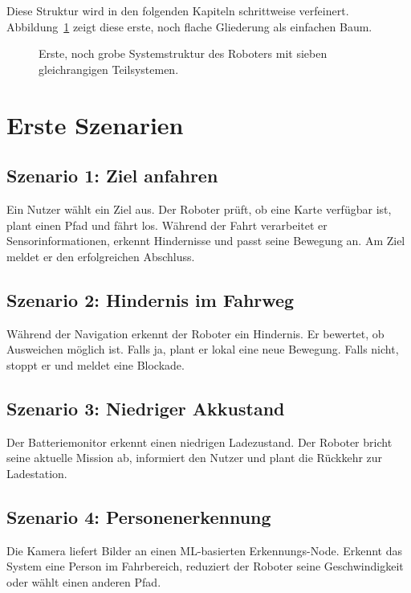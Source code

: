 Diese Struktur wird in den folgenden Kapiteln schrittweise verfeinert. Abbildung~\ref{fig:kap05-systemstruktur-uebersicht} zeigt diese erste, noch flache Gliederung als einfachen Baum.

\begin{figure}[H]
  \centering
  \caption{Erste, noch grobe Systemstruktur des Roboters mit sieben gleichrangigen Teilsystemen.}
  \label{fig:kap05-systemstruktur-uebersicht}
\end{figure}

\section{Erste Szenarien}
\subsection{Szenario 1: Ziel anfahren}
Ein Nutzer wählt ein Ziel aus. Der Roboter prüft, ob eine Karte verfügbar ist, plant einen Pfad und fährt los. Während der Fahrt verarbeitet er Sensorinformationen, erkennt Hindernisse und passt seine Bewegung an. Am Ziel meldet er den erfolgreichen Abschluss.

\subsection{Szenario 2: Hindernis im Fahrweg}
Während der Navigation erkennt der Roboter ein Hindernis. Er bewertet, ob Ausweichen möglich ist. Falls ja, plant er lokal eine neue Bewegung. Falls nicht, stoppt er und meldet eine Blockade.

\subsection{Szenario 3: Niedriger Akkustand}
Der Batteriemonitor erkennt einen niedrigen Ladezustand. Der Roboter bricht seine aktuelle Mission ab, informiert den Nutzer und plant die Rückkehr zur Ladestation.

\subsection{Szenario 4: Personenerkennung}
Die Kamera liefert Bilder an einen ML-basierten Erkennungs-Node. Erkennt das System eine Person im Fahrbereich, reduziert der Roboter seine Geschwindigkeit oder wählt einen anderen Pfad.

